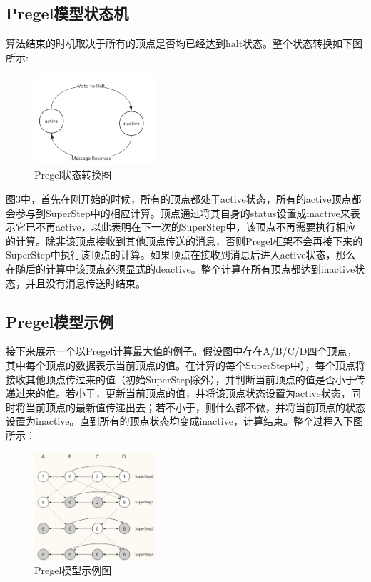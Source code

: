 \documentclass[10pt,a4paper,twocolumn,twoside,UTF8]{ctexart}
\begin{document}
	\subsection{Pregel模型状态机}
	算法结束的时机取决于所有的顶点是否均已经达到halt状态。整个状态转换如下图所示:
	\begin{figure}[htbp]
		\centering
		\includegraphics[width=0.4\textwidth]{img//pic3.png}
		\caption{Pregel状态转换图}
		\label{pic3}
	\end{figure}
	
	 图3中，首先在刚开始的时候，所有的顶点都处于active状态，所有的active顶点都会参与到SuperStep中的相应计算。顶点通过将其自身的status设置成inactive来表示它已不再active，以此表明在下一次的SuperStep中，该顶点不再需要执行相应的计算。除非该顶点接收到其他顶点传送的消息，否则Pregel框架不会再接下来的SuperStep中执行该顶点的计算。如果顶点在接收到消息后进入active状态，那么在随后的计算中该顶点必须显式的deactive。整个计算在所有顶点都达到inactive状态，并且没有消息传送时结束。
	 \subsection{Pregel模型示例}
	接下来展示一个以Pregel计算最大值的例子。假设图中存在A/B/C/D四个顶点，其中每个顶点的数据表示当前顶点的值。在计算的每个SuperStep中），每个顶点将接收其他顶点传过来的值（初始SuperStep除外），并判断当前顶点的值是否小于传递过来的值。若小于，更新当前顶点的值，并将该顶点状态设置为active状态，同时将当前顶点的最新值传递出去；若不小于，则什么都不做，并将当前顶点的状态设置为inactive。直到所有的顶点状态均变成inactive，计算结束。整个过程入下图所示：
	
	\begin{figure}[htbp]
		\centering
		\includegraphics[width=0.4\textwidth]{img//pic4.png}
		\caption{Pregel模型示例图}
		\label{pic4}
	\end{figure}
	
\end{document}
